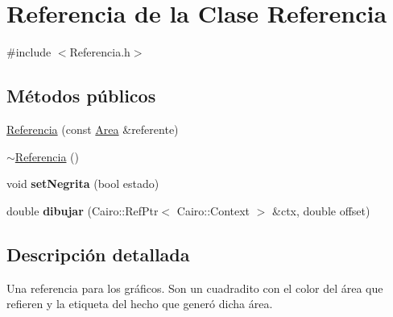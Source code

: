 \hypertarget{classReferencia}{\section{\-Referencia de la \-Clase \-Referencia}
\label{classReferencia}
}


{\ttfamily \#include $<$\-Referencia.\-h$>$}

\subsection*{\-Métodos públicos}
\begin{DoxyCompactItemize}
\item 
\hyperlink{classReferencia_a9efdb142fdfdd4dd0e1eddee06a2eacf}{\-Referencia} (const \hyperlink{classArea}{\-Area} \&referente)
\item 
\hyperlink{classReferencia_a8a6d20345b5228fcad17c6cf50a05e95}{$\sim$\-Referencia} ()
\item 
\hypertarget{classReferencia_a93afb8babfb9bb956f37488566647f76}{void {\bfseries set\-Negrita} (bool estado)}\label{classReferencia_a93afb8babfb9bb956f37488566647f76}

\item 
\hypertarget{classReferencia_a5021d720378f0b9442d06cf5dad607a6}{double {\bfseries dibujar} (\-Cairo\-::\-Ref\-Ptr$<$ \-Cairo\-::\-Context $>$ \&ctx, double offset)}\label{classReferencia_a5021d720378f0b9442d06cf5dad607a6}

\end{DoxyCompactItemize}


\subsection{\-Descripción detallada}
\-Una referencia para los gráficos. \-Son un cuadradito con el color del área que refieren y la etiqueta del hecho que generó dicha área. 

